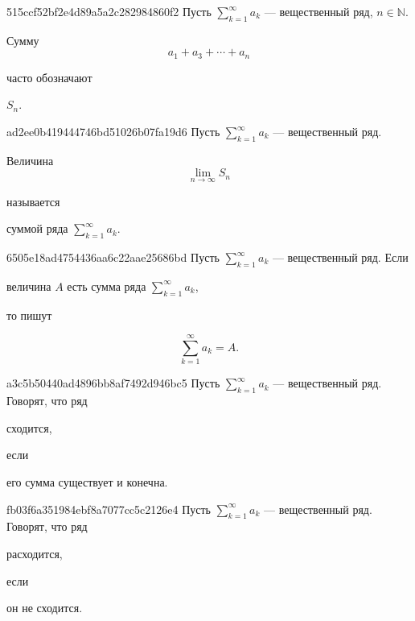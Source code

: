 \begin{note}{515ccf52bf2e4d89a5a2c282984860f2}
    Пусть \({ \sum_{k=1}^{\infty} a_k }\) --- вещественный ряд, \({ n \in \mathbb N }\).
    \begin{icloze}{1}
        Сумму
        \[
            a_1 + a_3 + \cdots + a_n
        \]
    \end{icloze}
    часто обозначают \begin{icloze}{2}\({ S_n }\).\end{icloze}
\end{note}

\begin{note}{ad2ee0b419444746bd51026b07fa19d6}
    Пусть \({ \sum_{k=1}^{\infty} a_k }\) --- вещественный ряд.
    \begin{icloze}{1}
        Величина
        \[
            \lim_{n \to \infty} S_n
        \]
    \end{icloze}
    называется \begin{icloze}{2}суммой ряда \({ \sum_{k=1}^{\infty} a_k }\).\end{icloze}
\end{note}

\begin{note}{6505e18ad4754436aa6c22aae25686bd}
    Пусть \({ \sum_{k=1}^{\infty} a_k }\) --- вещественный ряд.
    Если \begin{icloze}{2}величина \({ A }\) есть сумма ряда \({ \sum_{k=1}^{\infty} a_k }\),\end{icloze} то пишут
    \begin{icloze}{1}
        \[
            \sum_{k=1}^{\infty} a_k = A.
        \]
    \end{icloze}
\end{note}

\begin{note}{a3c5b50440ad4896bb8af7492d946bc5}
    Пусть \({ \sum_{k=1}^{\infty} a_k }\) --- вещественный ряд.
    Говорят, что ряд \begin{icloze}{2}сходится,\end{icloze} если \begin{icloze}{1}его сумма существует и конечна.\end{icloze}
\end{note}

\begin{note}{fb03f6a351984ebf8a7077cc5c2126e4}
    Пусть \({ \sum_{k=1}^{\infty} a_k }\) --- вещественный ряд.
    Говорят, что ряд \begin{icloze}{2}расходится,\end{icloze} если \begin{icloze}{1}он не сходится.\end{icloze}
\end{note}

